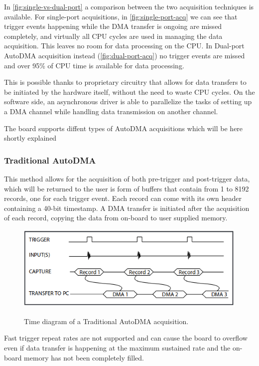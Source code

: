     In \autoref{fig:single-vs-dual-port} a comparison between the two acquisition techniques is available. For single-port acquisitions, in \autoref{fig:single-port-acq} we can see that trigger events happening while the \ac{DMA} transfer is ongoing are missed completely, and virtually all CPU cycles are used in managing the data acquisition. This leaves no room for data processing on the CPU. In Dual-port AutoDMA acquisition instead (\autoref{fig:dual-port-acq}) no trigger events are missed and over 95\% of CPU time is available for data processing. 
    
    This is possible thanks to proprietary circuitry that allows for data transfers to be initiated by the hardware itself, without the need to waste CPU cycles. On the software side, an asynchronous driver is able to parallelize the tasks of setting up a DMA channel while handling data transmission on another channel. 


	The board supports diffent types of AutoDMA acquisitions which will be here shortly explained 

	\subsubsection{Traditional AutoDMA}
	This method allows for the acquisition of both pre-trigger and post-trigger data, which will be returned to the user is form of buffers that contain from 1 to 8192 records, one for each trigger event. Each record can come with its own header containing a 40-bit timestamp. A DMA transfer is initiated after the acquisition of each record, copying the data from on-board to user supplied memory.
	
	 \begin{figure}[bth]
		\myfloatalign
		{\includegraphics[width=.75\linewidth]{gfx/ch3/traditional-autodma}}
		\caption{Time diagram of a Traditional AutoDMA acquisition.}\label{fig:traditional-autodma}
	\end{figure}
	
	Fast trigger repeat rates are not supported and can cause the board to overflow even if data transfer is happening at the maximum sustained rate and the on-board memory has not been completely filled. 
	
